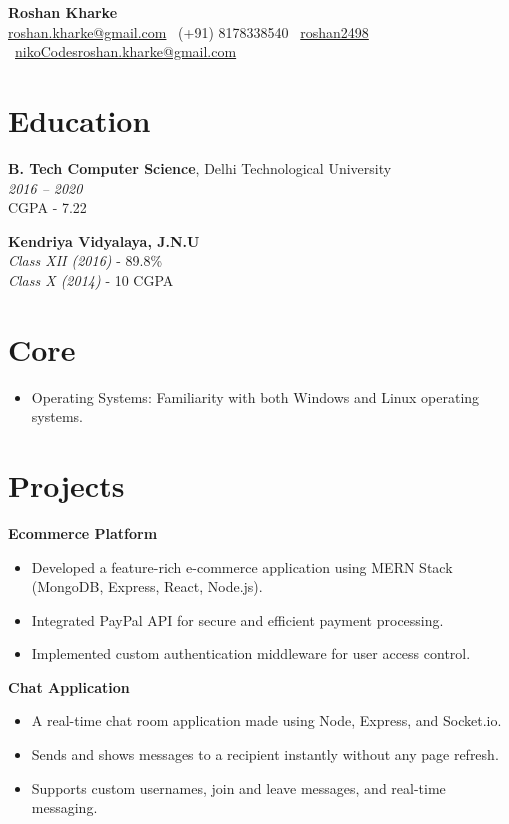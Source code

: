 \documentclass[a4paper,10pt]{article}
\begin{document}
\begin{center}
    \textbf{\LARGE Roshan Kharke}\\
    \href{mailto:roshan.kharke@gmail.com}{roshan.kharke@gmail.com} \textbullet\ (+91) 8178338540 \textbullet\ \href{https://github.com/roshan2498}{roshan2498} \textbullet\ \href{https://linkedin.com/in/roshan2498}{nikoCodesroshan.kharke@gmail.com}
\end{center}

\section*{Education}
\textbf{B. Tech Computer Science}, Delhi Technological University\\
\emph{2016 – 2020}\\
CGPA - 7.22

\textbf{Kendriya Vidyalaya, J.N.U}\\
\emph{Class XII (2016)} - 89.8\%\\
\emph{Class X (2014)} - 10 CGPA

\section*{Core}
\begin{itemize}
    \item Operating Systems: Familiarity with both Windows and Linux operating systems.
\end{itemize}

\section*{Projects}
\textbf{Ecommerce Platform}
\begin{itemize}
    \item Developed a feature-rich e-commerce application using MERN Stack (MongoDB, Express, React, Node.js).
    \item Integrated PayPal API for secure and efficient payment processing.
    \item Implemented custom authentication middleware for user access control.
\end{itemize}

\textbf{Chat Application}
\begin{itemize}
    \item A real-time chat room application made using Node, Express, and Socket.io.
    \item Sends and shows messages to a recipient instantly without any page refresh.
    \item Supports custom usernames, join and leave messages, and real-time messaging.
\end{itemize}
\end{document}
